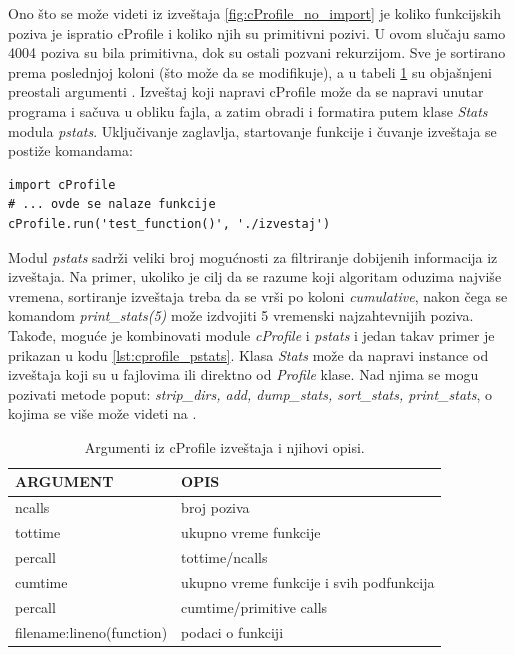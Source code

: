 \documentclass[a4paper]{article}
\begin{document}
Ono što se može videti iz izveštaja \ref{fig:cProfile_no_import} je koliko funkcijskih poziva je ispratio cProfile i koliko njih su primitivni pozivi. U ovom slučaju samo 4004 poziva su bila primitivna, dok su ostali pozvani rekurzijom. Sve je sortirano prema poslednjoj koloni (što može da se modifikuje), a u tabeli \ref{tab:cProfile_args} su objašnjeni preostali argumenti \cite{cProfile}. Izveštaj koji napravi cProfile može da se napravi unutar programa i sačuva u obliku fajla, a zatim obradi i formatira putem klase {\em Stats} modula {\em pstats}. Uključivanje zaglavlja, startovanje funkcije i čuvanje izveštaja se postiže komandama: \newpage
\begin{lstlisting}[caption={Primer čuvanja izveštaja u fajl.},frame=single, label=lbl:cProfile_report]
import cProfile
# ... ovde se nalaze funkcije
cProfile.run('test_function()', './izvestaj')
\end{lstlisting}
Modul {\em pstats} sadrži veliki broj mogućnosti za filtriranje dobijenih informacija iz izveštaja. Na primer, ukoliko je cilj da se razume koji algoritam oduzima najviše vremena, sortiranje izveštaja treba da se vrši po koloni {\em cumulative}, nakon čega se komandom {\em print\_stats(5)} može izdvojiti 5 vremenski najzahtevnijih poziva. Takođe, moguće je kombinovati module {\em cProfile} i {\em pstats} i jedan takav primer je prikazan u kodu \ref{lst:cprofile_pstats}. Klasa {\em Stats} može da napravi instance od izveštaja koji su u fajlovima ili direktno od {\em Profile} klase. Nad njima se mogu pozivati metode poput: {\em strip\_dirs, add, dump\_stats, sort\_stats, print\_stats}, o kojima se više može videti na \cite{cProfile}.
\vspace{-5pt}
\begin{table}[h!]
\begin{center}
\caption{Argumenti iz cProfile izveštaja i njihovi opisi.}
\begin{tabular}{|l|l|} \hline
\textbf{ARGUMENT} & \textbf{OPIS} \\ \hline
ncalls & broj poziva\\ \hline
tottime & ukupno vreme funkcije\\ \hline
percall & tottime/ncalls\\ \hline 
cumtime & ukupno vreme funkcije i svih podfunkcija\\ \hline
percall & cumtime/primitive calls\\ \hline
filename:lineno(function) & podaci o funkciji \\ \hline
\end{tabular}
\label{tab:cProfile_args}
\end{center}
\end{table}
\vspace{-20pt}
\end{document}
